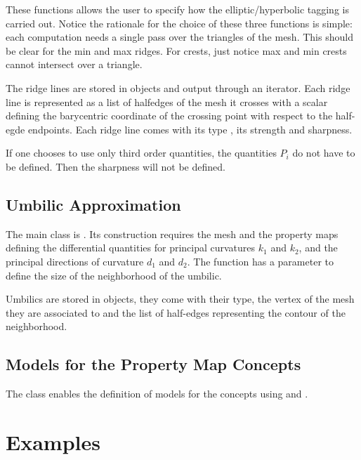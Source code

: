 These functions allows the user to specify how the elliptic/hyperbolic
tagging is carried out.
Notice the rationale for the choice of these three functions is
simple: each computation needs a single pass over the triangles of the
mesh. This should be clear for the min and max ridges. For crests,
just notice max and min crests cannot intersect over a triangle.
\medskip

The ridge lines are stored in
 objects and output through an iterator. 
Each ridge line is represented as a list of halfedges of the mesh it
crosses with a scalar defining the barycentric coordinate of the
crossing point with respect to the half-egde endpoints. Each ridge
line comes with its type , its strength and sharpness.

If one chooses to use only third order quantities, the quantities
$P_i$ do not have to be defined. Then the sharpness will not be
defined.

\subsection{Umbilic Approximation}
The main class is
.
Its construction requires the mesh and the property maps defining the
differential quantities for principal curvatures $k_1$ and $k_2$, and
the principal directions of curvature $d_1$ and $d_2$.  The function
 has a parameter to define the size of the neighborhood
of the umbilic.

Umbilics are stored in  objects, they come with their
type, the vertex of the mesh they are associated to and the list of
half-edges representing the contour of the neighborhood.


\subsection{Models for the Property Map Concepts}
The class
enables the definition of models for the concepts
using  and .


\section{Examples} 
\label{examples}

